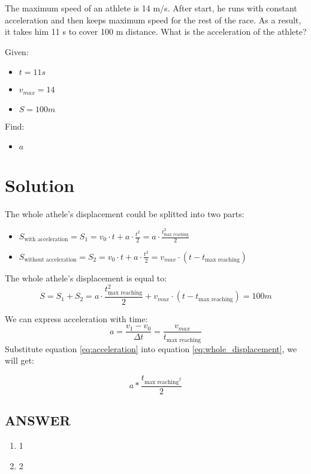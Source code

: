 
The maximum speed of an athlete is 14 m/s. After start, he runs with constant acceleration and
then keeps maximum speed for the rest of the race. As a result, it takes him 11 s to cover 100 m
distance. What is the acceleration of the athlete?

\bigbreak Given:

\begin{itemize}
    \item $t = 11s$
    \item $v_{max} = 14$
    \item $S = 100m$
\end{itemize}

\bigbreak Find:

\begin{itemize}
    \item $a$
\end{itemize}

\section*{Solution}

The whole athele's displacement could be splitted into two parts:

\begin{itemize}
    \item $S_{\text{with acceleration}} = S_1 = v_0 \cdot t + a \cdot \frac{t^2}{2} = a \cdot \frac{t_{\text{max reaching}}^2}{2}$
    \item $ S_{\text{without acceleration}} = S_2 = v_0 \cdot t + a \cdot \frac{t^2}{2} = v_{max} \cdot (t - t_{\text{max reaching}})$
\end{itemize}

The whole athele's displacement is equal to:
\begin{equation}
    \label{eq:whole_displacement}
    S = S_1 + S_2 = a \cdot \frac{t_{\text{max reaching}}^2}{2} + v_{max} \cdot (t - t_{\text{max reaching}}) = 100m
\end{equation}

We can express acceleration with time:
\begin{equation}
    \label{eq:acceleration}
    a = \frac{v_1 - v_0}{\Delta t} = \frac{v_{max}}{t_{\text{max reaching}}}
\end{equation}
Substitute equation \ref{eq:acceleration} into equation \ref{eq:whole_displacement}, we will get:

$$a * \frac{t_{\text{max reaching}^2}}{2}$$


\vfill \subsection*{ANSWER}
\begin{enumerate}
    \item 1
    \item 2
\end{enumerate}
